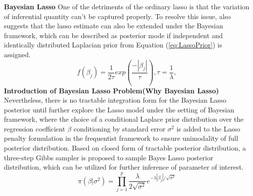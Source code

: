 \textbf{Bayesian Lasso}
One of the detriments of the ordinary lasso is that the variation of inferential quantity can't be captured properly. To resolve this issue, \cite{tibshirani_1996} also suggests that the lasso estimate can also be extended under the Bayesian framework, which can be described as posterior mode if independent and identically distributed Laplacian prior from Equation (\ref{eq:LassoPrior}) is assigned.
\begin{equation}
	\label{eq:LassoPrior}
	f(\beta_j) = \frac{1}{2\tau} exp(\frac{-|\beta_j|}{\tau}), \tau = \frac{1}{\lambda},
\end{equation}
\textbf{Introduction of Bayesian Lasso Problem(Why Bayesian Lasso)}
Nevertheless, there is no tractable integration form for the Bayesian Lasso posterior until \cite{park_casella_2008} further explore the Lasso model under the setting of Bayesian framework, where the choice of a conditional Laplace prior distribution over the regression coefficient $\beta$ conditioning by standard error $\sigma^2$ is added to the Lasso penalty formulation in the frequentist framework to ensure unimodality of full posterior distribution. Based on closed form of tractable posterior distribution, a three-step Gibbs sampler is proposed to sample Bayes Lasso posterior distribution, which can be utilized for further inference of parameter of interest.
\begin{equation}
	\label{eq:lassoprior}
	\pi(\beta |\sigma^2) = \prod_{j=1}^p \frac{\lambda}{2\sqrt{\sigma^2}} e^{-\lambda|\beta_j|/\sqrt{\sigma^2}}
\end{equation}

